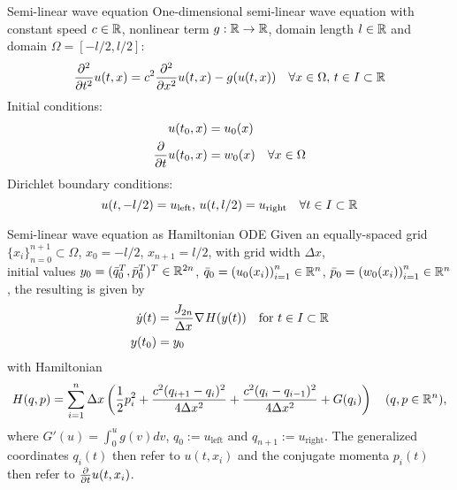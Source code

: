 \begin{frame}{Semi-linear wave equation}
  One-dimensional semi-linear wave equation with constant speed $c \in \mathbb{R}$, nonlinear term 
  $g : \mathbb{R} \to \mathbb{R}$, domain length $l \in \mathbb{R}$ and domain $\Omega = [-l/2, l/2]$:
  \begin{equation*}
    \frac{\partial^2}{\partial t^2} u(t,x) = 
    c^2 \frac{\partial^2}{\partial x^2} u(t,x) - g(u(t,x)) 
    \quad \forall x \in \Omega, 
    \, t \in I \subset \mathbb{R}
  \end{equation*}
  Initial conditions:
  \begin{align*}
    u(t_0,x) &= u_0(x) \\
    \frac{\partial }{\partial t} u(t_0,x) &= w_0(x) \quad \forall x \in \Omega
  \end{align*}
  Dirichlet boundary conditions:
  \begin{equation*}
    u(t,-l/2) = u_{\text{left}}, \, u(t,l/2) = u_{\text{right}} \quad \forall t \in I \subset \mathbb{R}
  \end{equation*}
\end{frame}

\begin{frame}{Semi-linear wave equation as Hamiltonian ODE}
  Given an equally-spaced grid $\{ x_i \}_{n=0}^{n+1} \subset \Omega$, $x_0 = -l/2$, $x_{n+1} = l/2$,
  with grid width $\Delta x$,\\
  initial values $y_0 = (\bar{q}_0^T, \bar{p}_0^T)^T \in \mathbb{R}^{2n}$, $\bar{q}_0 = \left( u_0(x_i) \right)_{i=1}^n \in \mathbb{R}^n$, 
  $\bar{p}_0 = \left( w_0(x_i) \right)_{i=1}^n \in \mathbb{R}^n$,
  the resulting  is given by
  \begin{align*}
    \dot{y}(t) &= \frac{J_{2n}}{\Delta x} \nabla_{}{H}(y(t)) \quad \text{for } t \in I \subset \mathbb{R} \\
    y(t_0) &= y_0
  \end{align*}
  with Hamiltonian
  \begin{equation*}
    H(q,p) = \sum_{i=1}^n \Delta x \left( 
    \frac{1}{2} p_i^2 + \frac{c^2 (q_{i+1} - q_i)^2}{4 \Delta x^2} 
    + \frac{c^2 (q_i - q_{i-1})^2}{4 \Delta x^2} + G(q_i)
    \right)
    \quad (q,p \in \mathbb{R}^n)
    ,
  \end{equation*}
  where $G'(u) = \int_0^u g(v) dv$, $q_0 := u_{\text{left}}$ and $q_{n+1} := u_{\text{right}}$.
  The generalized coordinates $q_i(t)$ then refer to $u(t,x_i)$ and 
  the conjugate momenta $p_i(t)$ then refer to $\frac{\partial }{\partial t} u(t,x_i)$.
\end{frame}

